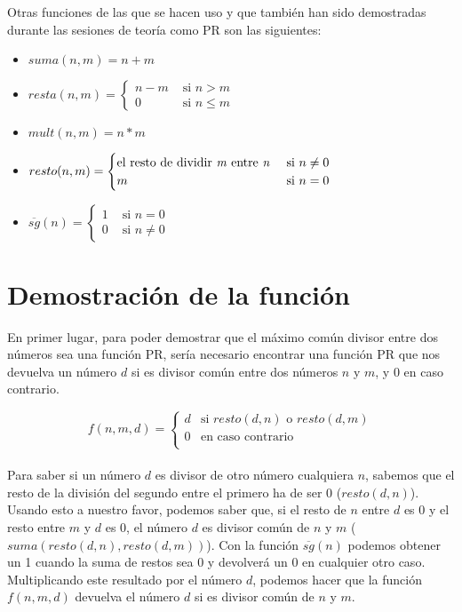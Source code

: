 \documentclass[a4paper,12pt]{article}
\begin{document}
Otras funciones de las que se hacen uso y que también han sido demostradas durante las sesiones de teoría como PR son las siguientes:

\begin{itemize}
    \item $suma(n,m) = n + m$
    \item $resta(n,m) =
    \begin{cases}
        n - m & \text{ si } n > m \\
        0 & \text{ si } n \leq m
    \end{cases}$
    \item $mult(n,m) = n * m$
    \item $resto(n,m) = 
    \begin{cases}
        \text{el resto de dividir \textit{m} entre \textit{n}} & \text{ si } n \neq 0 \\
        m & \text{ si } n = 0
    \end{cases}$
    \item $\overline{sg}(n) = 
    \begin{cases}
        1 & \text{ si } n = 0 \\
        0 & \text{ si } n \neq 0
    \end{cases}$
\end{itemize}

\section{Demostración de la función}

En primer lugar, para poder demostrar que el máximo común divisor entre dos números sea una función PR, sería necesario encontrar una función PR que nos devuelva un número $d$ si es divisor común entre dos números $n$ y $m$, y 0 en caso contrario.


$$f(n,m,d)=
\begin{cases}
    d&\text{si }resto(d,n)\text{ o } resto(d,m)\\
    0&\text{en caso contrario}\\
\end{cases}
$$
\\
Para saber si un número $d$ es divisor de otro número cualquiera $n$, sabemos que el resto de la división del segundo entre el primero ha de ser 0 ($resto(d,n)$). Usando esto a nuestro favor, podemos saber que, si el resto de $n$ entre $d$ es 0 y el resto entre $m$ y $d$ es 0, el número $d$ es divisor común de $n$ y $m$ ($suma(resto(d,n), resto(d,m))$). Con la función $\overline{sg}(n)$ podemos obtener un 1 cuando la suma de restos sea 0 y devolverá un 0 en cualquier otro caso. Multiplicando este resultado por el número $d$, podemos hacer que la función $f(n,m,d)$ devuelva el número $d$ si es divisor común de $n$ y $m$.
\end{document}
